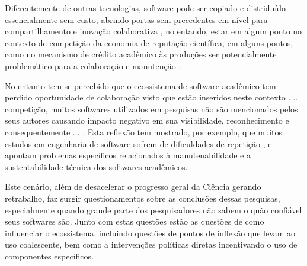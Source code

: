 
Diferentemente de outras tecnologias, software pode ser copiado e distriduído
essencialmente sem custo, abrindo portas sem precedentes em nível para
compartilhamento e inovação colaborativa \cite{howison2011scientific}, no
entando, estar em algum ponto no contexto de competição da economia de
reputação científica, em alguns pontos, como no mecanismo de crédito acadêmico
às produções ser potencialmente problemático para a colaboração e manutenção
\cite{howison2011scientific}.

No entanto tem se percebido que o ecossistema de software acadêmico tem perdido
oportunidade de colaboração visto que estão inseridos neste contexto ....
competição, muitos softwares utilizados em pesquisas não são mencionados pelos
seus autores causando impacto negativo em sua visibilidade, reconhecimento e
consequentemente ...  \cite{howison2016software}. Esta reflexão tem mostrado,
por exemplo, que muitos estudos em engenharia de software sofrem de
dificuldades de repetição \cite{tang2016worthiness}, e apontam problemas específicos
relacionados à manutenabilidade e a sustentabilidade técnica dos softwares
acadêmicos.

Este cenário, além de desacelerar o progresso geral da Ciência gerando
retrabalho, faz surgir questionamentos sobre as conclusões dessas pesquisas,
especialmente quando grande parte dos pesquisadores não sabem o quão confiável
seus softwares são. Junto com estas questões estão as questões de como
influenciar o ecossistema, incluindo questões de pontos de inflexão que levam
ao uso coalescente, bem como a intervenções políticas diretas incentivando o
uso de componentes específicos.





